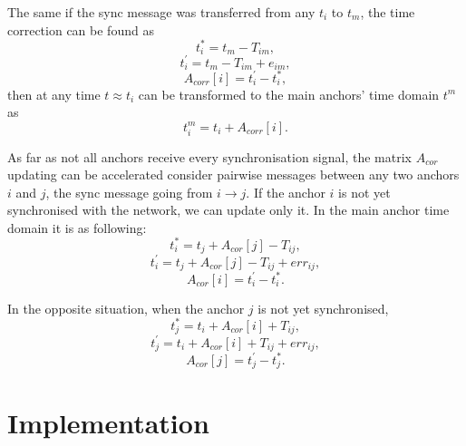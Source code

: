 \documentclass[10pt,journal,compsoc]{IEEEtran}
\begin{document}
The same if the sync message was transferred from any $t_i$ to $t_m$, the time correction can be found as
\begin{equation}
    t_i^{*} = t_m - T_{im},
\end{equation}
\begin{equation}
    t_i^{'} = t_m - T_{im} + e_{im},
\end{equation}
\begin{equation}
    A_{corr}[i] = t_i^{'} - t_i^{*},
\end{equation}
then at any time $t \approx t_i$ can be transformed to the main anchors' time domain $t^m$ as
\begin{equation}
    t_i^{m} = t_i + A_{corr}[i].
\end{equation}

As far as not all anchors receive every synchronisation signal, the matrix $A_{cor}$ updating can be accelerated consider pairwise messages between any two anchors $i$ and $j$, the sync message going from $i \rightarrow j$. If the anchor $i$ is not yet synchronised with the network, we can update only it. In the main anchor time domain it is as following:
\begin{equation}
    t_i^{*} = t_j + A_{cor}[j] - T_{ij},
\end{equation}
\begin{equation}
    t_i^{'} = t_j + A_{cor}[j] - T_{ij} + err_{ij},
\end{equation}
\begin{equation}
    A_{cor}[i] = t_i^{'} - t_i^{*}.
\end{equation}

In the opposite situation, when the anchor $j$ is not yet synchronised,
\begin{equation}
    t_j^{*} = t_i + A_{cor}[i] + T_{ij},
\end{equation}
\begin{equation}
    t_j^{'} = t_i + A_{cor}[i] + T_{ij} + err_{ij},
\end{equation}
\begin{equation}
    A_{cor}[j] = t_j^{'} - t_j^{*}.
\end{equation}

\section{Implementation}
\label{sec:impl}

\end{document}
